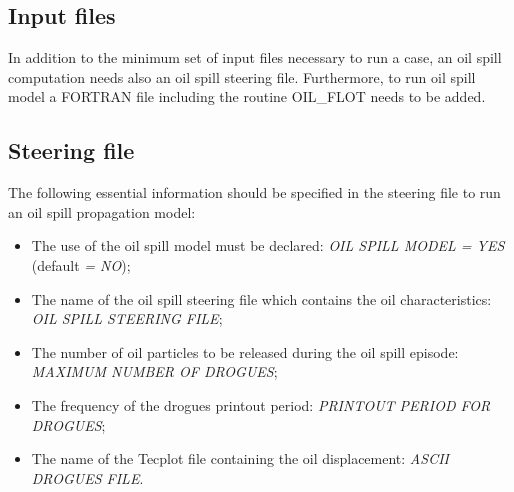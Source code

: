\subsection{ Input files}

 In addition to the minimum set of input files necessary to run a  case, an oil spill computation needs also an oil spill steering file. Furthermore, to run oil spill model a FORTRAN file including the routine OIL\_FLOT needs to be added.


\subsection{ Steering file}

 The following essential information should be specified in the \telemac{} steering file to run an oil spill propagation model:

\begin{itemize}
\item  The use of the oil spill model must be declared: \textit{OIL SPILL MODEL = YES} (default\textit{ = NO});

\item  The name of the oil spill steering file which contains the oil characteristics: \textit{OIL SPILL STEERING FILE};

\item  The number of oil particles to be released during the oil spill episode: \newline \textit{MAXIMUM NUMBER OF DROGUES};

\item  The frequency of the drogues printout period: \textit{PRINTOUT PERIOD FOR DROGUES};

\item  The name of the Tecplot file containing the oil displacement: \textit{ASCII DROGUES FILE}.
\end{itemize}

